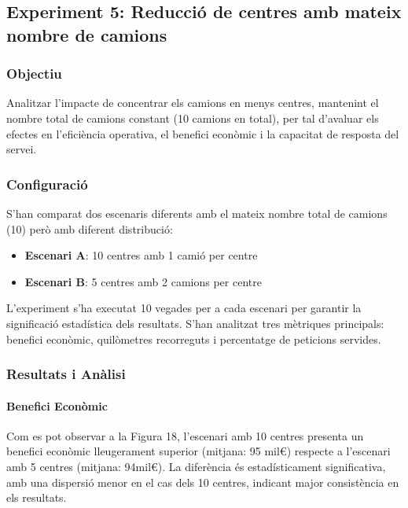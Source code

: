 \subsection{Experiment 5: Reducció de centres amb mateix nombre de camions}

\vspace{0.5cm}


\subsubsection{Objectiu}
Analitzar l'impacte de concentrar els camions en menys centres, mantenint el nombre total de camions constant (10 camions en total), per tal d'avaluar els efectes en l'eficiència operativa, el benefici econòmic i la capacitat de resposta del servei.


\vspace{0.5cm}


\subsubsection{Configuració}
S'han comparat dos escenaris diferents amb el mateix nombre total de camions (10) però amb diferent distribució:
\begin{itemize}
    \item \textbf{Escenari A}: 10 centres amb 1 camió per centre
    \item \textbf{Escenari B}: 5 centres amb 2 camions per centre
\end{itemize}

L'experiment s'ha executat 10 vegades per a cada escenari per garantir la significació estadística dels resultats. S'han analitzat tres mètriques principals: benefici econòmic, quilòmetres recorreguts i percentatge de peticions servides.

\vspace{0.5cm}


\subsubsection{Resultats i Anàlisi}

\paragraph{Benefici Econòmic}

Com es pot observar a la Figura 18, l'escenari amb 10 centres presenta un benefici econòmic lleugerament superior (mitjana: 95 mil€) respecte a l'escenari amb 5 centres (mitjana: 94mil€). La diferència és estadísticament significativa, amb una dispersió menor en el cas dels 10 centres, indicant major consistència en els resultats.


